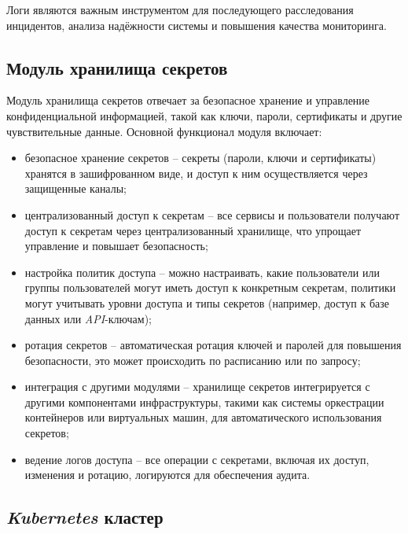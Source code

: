 Логи являются важным инструментом для последующего расследования инцидентов, анализа надёжности системы и повышения качества мониторинга.

\subsection{Модуль хранилища секретов}
\label{sec:secrets_storage_functionality}

Модуль хранилища секретов отвечает за безопасное хранение и управление конфиденциальной информацией, такой как ключи, пароли, сертификаты и другие чувствительные данные. Основной функционал модуля включает:

\begin{itemize}
    \item безопасное хранение секретов -- секреты (пароли, ключи и сертификаты) хранятся в зашифрованном виде, и доступ к ним осуществляется через защищенные каналы; 
    \item централизованный доступ к секретам -- все сервисы и пользователи получают доступ к секретам через централизованный хранилище, что упрощает управление и повышает безопасность; 
    \item настройка политик доступа -- можно настраивать, какие пользователи или группы пользователей могут иметь доступ к конкретным секретам, политики могут учитывать уровни доступа и типы секретов (например, доступ к базе данных или \textit{API}-ключам); 
    \item ротация секретов -- автоматическая ротация ключей и паролей для повышения безопасности, это может происходить по расписанию или по запросу; 
    \item интеграция с другими модулями -- хранилище секретов интегрируется с другими компонентами инфраструктуры, такими как системы оркестрации контейнеров или виртуальных машин, для автоматического использования секретов; 
    \item ведение логов доступа -- все операции с секретами, включая их доступ, изменения и ротацию, логируются для обеспечения аудита. 
\end{itemize}

\subsection{\textit{Kubernetes} кластер}
\label{sec:kubernetes_cluster_functionality}

